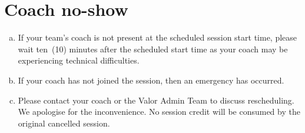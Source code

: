 \documentclass[10pt]{article}
\begin{document}
\section{Coach no-show}
\begin{enumerate}[(a)]
\item
If your team's coach is not present at the scheduled session start time, please wait ten~(10) minutes after the scheduled start time as your coach may be experiencing technical difficulties.

\item
If your coach has not joined the session, then an emergency has occurred.

\item
Please contact your coach or the Valor Admin Team to discuss rescheduling. We apologise for the inconvenience. No session credit will be consumed by the original cancelled session.
\end{enumerate}
\end{document}

